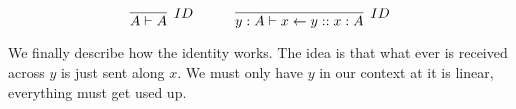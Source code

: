 \documentclass{article}
\begin{document}
\[
\infer[{ID}]
    {A \vdash A}
    {  }
\hspace{3em}   
\infer[{ID}]
    { y:A \vdash x \leftarrow y :: x : A}
    { }
\]

We finally describe how the identity works. The idea is that what ever is received across \(y\) is just sent along \(x\). We must only have \(y\) in our context at it is linear, everything must get used up. 

	
	
	
	
	
	
	
	
	
\end{document}
